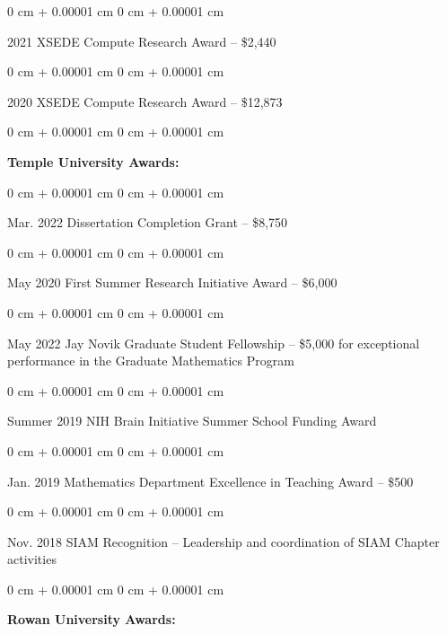 \documentclass[10pt, letterpaper]{article}
\newenvironment{onecolentry}{
    \begin{adjustwidth}{
        0 cm + 0.00001 cm
    }{
        0 cm + 0.00001 cm
    }
}{
    \end{adjustwidth}
} %
\begin{document}
\begin{onecolentry}
    2021 XSEDE Compute Research Award – \$2,440
\end{onecolentry}

\begin{onecolentry}
    2020 XSEDE Compute Research Award – \$12,873
\end{onecolentry}

\vspace{0.3 cm}

\begin{onecolentry}
    \textbf{Temple University Awards:}
\end{onecolentry}

\vspace{0.1 cm}

\begin{onecolentry}
    Mar. 2022 Dissertation Completion Grant – \$8,750
\end{onecolentry}

\begin{onecolentry}
    May 2020 First Summer Research Initiative Award – \$6,000
\end{onecolentry}

\begin{onecolentry}
    May 2022 Jay Novik Graduate Student Fellowship – \$5,000 for exceptional performance in the Graduate Mathematics Program
\end{onecolentry}

\begin{onecolentry}
    Summer 2019 NIH Brain Initiative Summer School Funding Award
\end{onecolentry}

\begin{onecolentry}
    Jan. 2019 Mathematics Department Excellence in Teaching Award – \$500
\end{onecolentry}

\begin{onecolentry}
    Nov. 2018 SIAM Recognition – Leadership and coordination of SIAM Chapter activities
\end{onecolentry}

\vspace{0.3 cm}

\begin{onecolentry}
    \textbf{Rowan University Awards:}
\end{onecolentry}

\vspace{0.1 cm}
\end{document}
